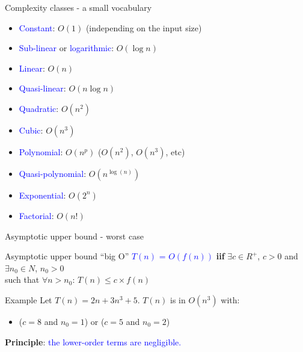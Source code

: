 \documentclass[english,10pt,table]{beamer}
\begin{document}
\begin{frame}{Complexity classes - a small vocabulary}
	\begin{block}{}
	 \begin{itemize}\small
 		  \item \textcolor{blue}{Constant}: \alert{$O(1)$} (independing on the input size)
     \item \textcolor{blue}{Sub-linear} or \textcolor{blue}{logarithmic}: \alert{$O(\log n)$}
     \item \textcolor{blue}{Linear}: \alert{$O(n)$}
					\item \textcolor{blue}{Quasi-linear}: \alert{$O(n \log n)$}
					\item \textcolor{blue}{Quadratic}: \alert{$O(n^2)$}
					\item \textcolor{blue}{Cubic}: \alert{$O(n^3)$}
     \item \textcolor{blue}{Polynomial}: \alert{$O(n^p)$} (\alert{$O(n^2)$}, \alert{$O(n^3)$}, etc)
     \item \textcolor{blue}{Quasi-polynomial}: \alert{$O(n^{\log(n)})$}
     \item \textcolor{blue}{Exponential}: \alert{$O(2^n)$}
					\item \textcolor{blue}{Factorial}: \alert{$O(n!)$}
		\end{itemize}
 \end{block}	
\end{frame}


\begin{frame}{Asymptotic upper bound - worst case}
	
	\begin{block}{Asymptotic upper bound  ``big O''}\small
		\textcolor{blue}{$T(n)$ = \alert{$O$}$(f(n))$} \textbf{iif} 
		\alert{$\exists c \in R^+$}, \alert{$c>0$} and \alert{$\exists n_0 \in N$}, \alert{$n_0>0$} \\
		such that \alert{$\forall n>n_0$}: \alert{$T(n) \leq c \times f(n) $}
 \end{block}	
	\pause
		\begin{block}{Example}\small
		Let \alert{$T(n) = 2n+3n^3 + 5$}. \alert{$T(n)$} is in \alert{$O(n^3)$} with:
	 \begin{itemize}
     \item (\alert{$c=8$} and \alert{$n_0=1$}) or (\alert{$c=5$} and \alert{$n_0=2$})
		\end{itemize}
 \end{block}	
	\pause
	\begin{block}{}\small
		\textbf{Principle}: \textcolor{blue}{the lower-order terms are negligible.}
 \end{block}		
\end{frame}
\end{document}
